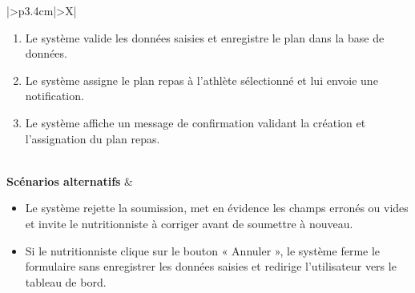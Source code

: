 \documentclass[a4paper,12pt]{report}
\begin{document}
\begin{table}[H]
\begin{tabularx}{\textwidth}{|>{\RaggedRight\arraybackslash}p{3.4cm}|>{\RaggedRight\arraybackslash}X|}
\begin{minipage}[t]{\linewidth}
\begin{enumerate}[label=\arabic*., leftmargin=*, topsep=0pt, itemsep=1pt]
    \item Le système valide les données saisies et enregistre le plan dans la base de données.
    \item Le système assigne le plan repas à l'athlète sélectionné et lui envoie une notification.
    \item Le système affiche un message de confirmation validant la création et l'assignation du plan repas.
\end{enumerate}
\vspace{2pt}
\end{minipage} \\
\hline
\textbf{Scénarios alternatifs} &
\begin{minipage}[t]{\linewidth}
\vspace{2pt}
\begin{itemize}[leftmargin=*, topsep=0pt, itemsep=1pt]
    \item  Le système rejette la soumission, met en évidence les champs erronés ou vides  et invite le nutritionniste à corriger avant de soumettre à nouveau.
    \item  Si le nutritionniste clique sur le bouton « Annuler », le système ferme le formulaire sans enregistrer les données saisies et redirige l’utilisateur vers le tableau de bord.
\end{itemize}
\vspace{2pt}
\end{minipage} \\
\hline
\end{tabularx}
\fussy
\end{table}
\end{document}
